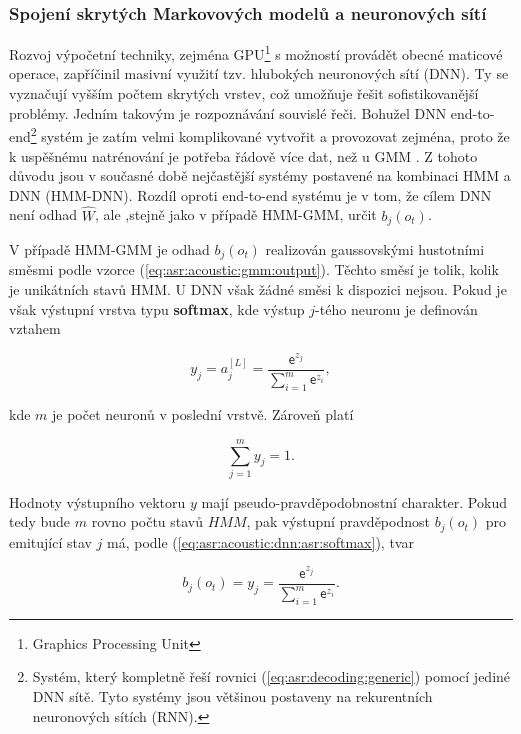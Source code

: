 \subsubsection{Spojení skrytých Markovových modelů a neuronových sítí}

Rozvoj výpočetní techniky, zejména GPU\footnote{Graphics Processing Unit} s možností provádět obecné maticové operace, zapříčinil masivní využití tzv. hlubokých neuronových sítí (DNN). Ty se vyznačují vyšším počtem skrytých vrstev, což umožňuje řešit sofistikovanější problémy. Jedním takovým je rozpoznávání souvislé řeči. Bohužel DNN end-to-end\footnote{Systém, který kompletně řeší rovnici (\ref{eq:asr:decoding:generic}) pomocí jediné DNN sítě. Tyto systémy jsou většinou postaveny na rekurentních neuronových sítích (RNN).} systém je zatím velmi komplikované vytvořit a provozovat zejména, proto že k uspěšnému natrénování je potřeba řádově více dat, než u GMM \cite{Amodei2016}. Z tohoto důvodu jsou v současné době nejčastější systémy postavené na kombinaci HMM a DNN (HMM-DNN). Rozdíl oproti end-to-end systému je v tom, že cílem DNN není odhad $\hat{W}$, ale ,stejně jako v případě HMM-GMM, určit $b_j\left(o_t\right)$.

V případě HMM-GMM je odhad $b_j\left(o_t\right)$ realizován gaussovskými hustotními směsmi podle vzorce (\ref{eq:asr:acoustic:gmm:output}). Těchto směsí je tolik, kolik je unikátních stavů HMM. U DNN však žádné směsi k dispozici nejsou. Pokud je však výstupní vrstva typu \textbf{softmax}, kde výstup $j$-tého neuronu je definován vztahem

\begin{equation}
  y_{j} = a_{j}^{[L]} = \frac{\mathsf{e}^{z_j}}{\sum_{i=1}^{m}\mathsf{e}^{z_i}},
  \label{eq:asr:acoustic:dnn:asr:softmax}
\end{equation}

\noindent kde $m$ je počet neuronů v poslední vrstvě. Zároveň platí

\begin{equation}
  \sum_{j=1}^{m} y_{j} = 1.
  \label{eq:asr:acoustic:dnn:asr:softmax:criterium}
\end{equation}

\noindent Hodnoty výstupního vektoru $y$ mají pseudo-pravděpodobnostní charakter. Pokud tedy bude $m$ rovno počtu stavů $HMM$, pak výstupní pravděpodnost $b_{j} \left(o_t\right)$ pro emitující stav $j$ má, podle (\ref{eq:asr:acoustic:dnn:asr:softmax}), tvar

\begin{equation}
  b_{j} \left(o_t\right) = y_{j} = \frac{\mathsf{e}^{z_j}}{\sum_{i=1}^{m}\mathsf{e}^{z_i}}.
  \label{eq:asr:acoustic:dnn:asr:softmax:criterium}
\end{equation}

